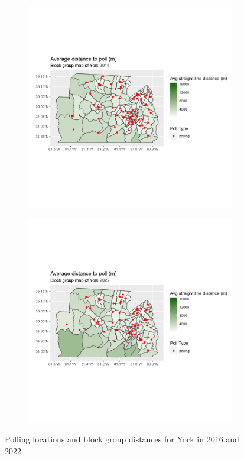 \documentclass[11pt]{article}
\theoremstyle{remark}
\theoremstyle{definition}
\begin{document}
\begin{figure}
	\begin{subfigure}{.5\textwidth}
		\centering
		\includegraphics[width=\linewidth]{result_analysis/York_SC_original_configs/distance_map_York_config_original_2016_polls.png}
		\label{sfig:York_2016_bg_dist}
	\end{subfigure} 
	\begin{subfigure}{.5\textwidth}
		\centering
		\includegraphics[width=\linewidth]{result_analysis/York_SC_original_configs/distance_map_York_config_original_2022_polls.png}
		\label{sfig:York_2022_bg_dist}
	\end{subfigure}
	\caption{Polling locations and block group distances for York in 2016 and 2022}
	\label{fig:York distance maps}
\end{figure}
\end{document}
